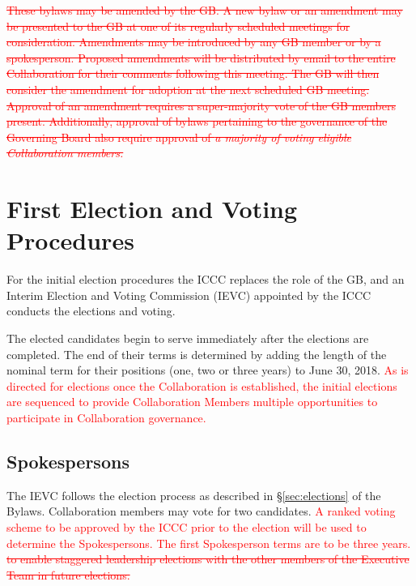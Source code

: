 \documentclass[12pt]{article}
\begin{document}
\textcolor{red} {\sout{
These bylaws may be amended by the GB. A new bylaw or an amendment may be presented to the GB at one of its regularly scheduled meetings for consideration. Amendments may be introduced by any GB member or by a spokesperson. Proposed amendments will be distributed by email to the entire Collaboration for their comments following this meeting. The GB will then consider the amendment for adoption at the next scheduled GB meeting. Approval of an amendment requires a super-majority vote of the GB members present. Additionally, approval of bylaws pertaining to the governance of the Governing Board also require approval of  {\it a majority of voting eligible Collaboration members.}
}}




\appendix
\appendixpage
\addappheadtotoc  %



\section{First Election and Voting Procedures}
\label{app:first_election}

For the initial election procedures the ICCC replaces the role of the GB, and an Interim Election and Voting Commission (IEVC) appointed by the ICCC conducts the elections and voting.  

The elected candidates begin to serve immediately after the elections are completed. The end of their terms is determined by adding the length of the nominal term for their positions (one, two or three years) to June 30, 2018. 
\textcolor{red}{As is directed for elections once the Collaboration is established, the initial elections are sequenced to provide Collaboration Members multiple opportunities to participate in Collaboration governance. }

\subsection{Spokespersons} 
The IEVC follows the election process as described in \S\ref{sec:elections} of the Bylaws.  Collaboration members may vote for two candidates.  \textcolor{red}{A ranked voting scheme to be approved by the ICCC prior to the election will be used to determine the Spokespersons. 
The first Spokesperson terms are to be three years. \sout{ to enable staggered leadership elections with the other members of the Executive Team in future elections.} }
\end{document}
